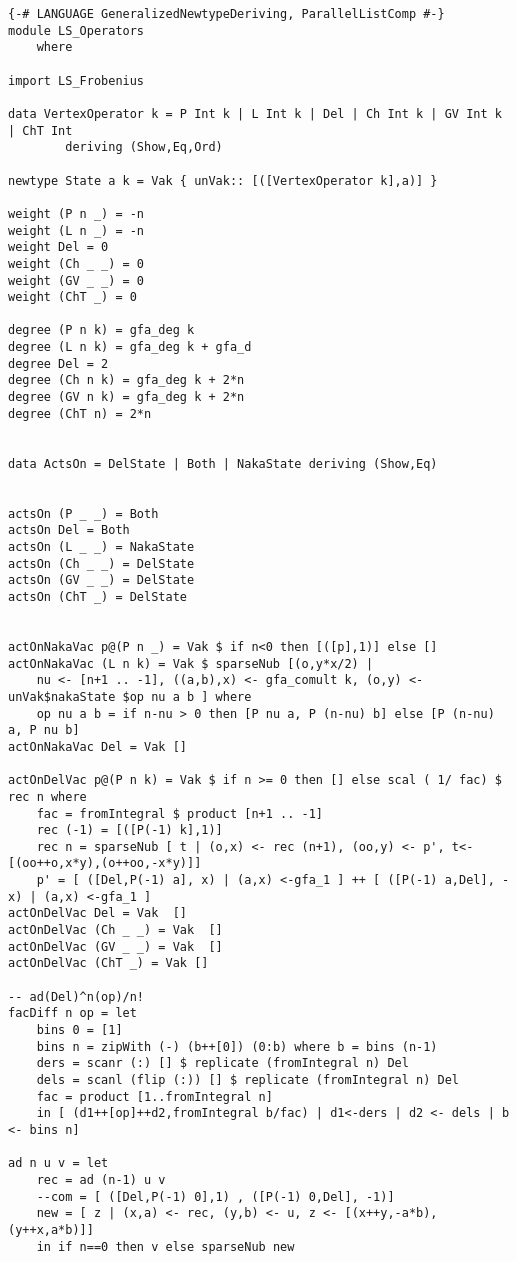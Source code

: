 \begin{lstlisting}
{-# LANGUAGE GeneralizedNewtypeDeriving, ParallelListComp #-}
module LS_Operators
	where

import LS_Frobenius

data VertexOperator k = P Int k | L Int k | Del | Ch Int k | GV Int k | ChT Int 
		deriving (Show,Eq,Ord)

newtype State a k = Vak { unVak:: [([VertexOperator k],a)] }

weight (P n _) = -n
weight (L n _) = -n
weight Del = 0
weight (Ch _ _) = 0
weight (GV _ _) = 0
weight (ChT _) = 0

degree (P n k) = gfa_deg k
degree (L n k) = gfa_deg k + gfa_d
degree Del = 2
degree (Ch n k) = gfa_deg k + 2*n
degree (GV n k) = gfa_deg k + 2*n
degree (ChT n) = 2*n


data ActsOn = DelState | Both | NakaState deriving (Show,Eq)


actsOn (P _ _) = Both
actsOn Del = Both
actsOn (L _ _) = NakaState
actsOn (Ch _ _) = DelState
actsOn (GV _ _) = DelState
actsOn (ChT _) = DelState


actOnNakaVac p@(P n _) = Vak $ if n<0 then [([p],1)] else []
actOnNakaVac (L n k) = Vak $ sparseNub [(o,y*x/2) | 
	nu <- [n+1 .. -1], ((a,b),x) <- gfa_comult k, (o,y) <-unVak$nakaState $op nu a b ] where
	op nu a b = if n-nu > 0 then [P nu a, P (n-nu) b] else [P (n-nu) a, P nu b]
actOnNakaVac Del = Vak []

actOnDelVac p@(P n k) = Vak $ if n >= 0 then [] else scal ( 1/ fac) $ rec n where
	fac = fromIntegral $ product [n+1 .. -1] 
	rec (-1) = [([P(-1) k],1)]
	rec n = sparseNub [ t | (o,x) <- rec (n+1), (oo,y) <- p', t<-[(oo++o,x*y),(o++oo,-x*y)]]   
	p' = [ ([Del,P(-1) a], x) | (a,x) <-gfa_1 ] ++ [ ([P(-1) a,Del], -x) | (a,x) <-gfa_1 ] 
actOnDelVac Del = Vak  []
actOnDelVac (Ch _ _) = Vak  []
actOnDelVac (GV _ _) = Vak  []
actOnDelVac (ChT _) = Vak []

-- ad(Del)^n(op)/n!
facDiff n op = let 
	bins 0 = [1]
	bins n = zipWith (-) (b++[0]) (0:b) where b = bins (n-1)
	ders = scanr (:) [] $ replicate (fromIntegral n) Del
	dels = scanl (flip (:)) [] $ replicate (fromIntegral n) Del
	fac = product [1..fromIntegral n] 
	in [ (d1++[op]++d2,fromIntegral b/fac) | d1<-ders | d2 <- dels | b <- bins n]

ad n u v = let
	rec = ad (n-1) u v
	--com = [ ([Del,P(-1) 0],1) , ([P(-1) 0,Del], -1)]
	new = [ z | (x,a) <- rec, (y,b) <- u, z <- [(x++y,-a*b),(y++x,a*b)]]
	in if n==0 then v else sparseNub new


\end{lstlisting}
